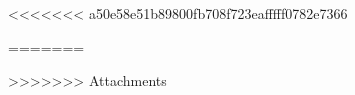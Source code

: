 \begin{anexosenv}
\partanexos
<<<<<<< a50e58e51b89800fb708f723eafffff0782e7366



=======

>>>>>>> Attachments
\end{anexosenv}

